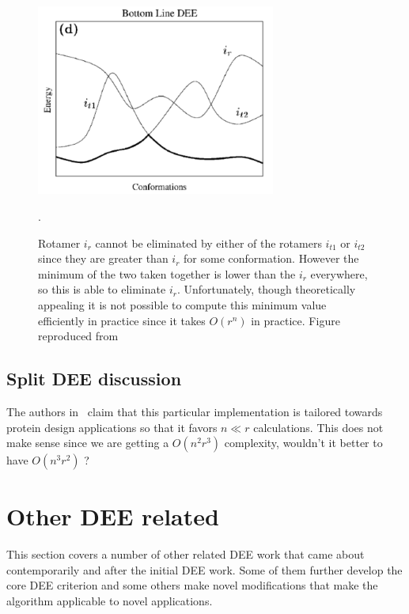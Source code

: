 \documentclass{article}
\begin{document}
\begin{figure}[h!]
    \centering
    \includegraphics[width=0.7\textwidth]{pics/bottom.pdf}
    \caption{Rotamer $i_r$ cannot be eliminated by either of the rotamers $i_{t1}$ or $i_{t2}$ since they are greater than $i_r$ for some conformation. However the minimum of the two taken together is lower than the $i_r$ everywhere, so this is able to eliminate $i_r$. Unfortunately, though theoretically appealing it is not possible to compute this minimum value efficiently in practice since it takes $O(r^n)$ in practice. Figure reproduced from~\cite{Pierce2000}}.
    \label{fig:bottomDEE}
\end{figure}

\pagebreak

\subsection*{Split DEE discussion}
The authors in~\cite{Pierce2000} claim that this particular implementation is tailored towards protein design applications so that it favors $n \ll r$ calculations. This does not make sense since we are getting a $O(n^2r^3)$ complexity, wouldn't it better to have $O(n^3r^2)$ ?


\section{Other DEE related}
This section covers a number of other related DEE work that came about contemporarily and after the initial DEE work. Some of them further develop the core DEE criterion and some others make novel modifications that make the algorithm applicable to novel applications. 
\end{document}
